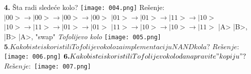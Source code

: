 \documentclass{article}
\begin{document}
\vspace{0.4cm}\newline
\textbf{4.} Šta radi sledeće kolo?
\newline
\texttt{[image: 004.png]}
\vspace*{0.4cm}\newline
Rešenje: \vspace{0.2cm}\newline
$|00> \longrightarrow |00> \longrightarrow |00> \longrightarrow |00>$
\newline
$|01> \longrightarrow |01> \longrightarrow |11> \longrightarrow |10>$
\newline
$|10> \longrightarrow |11> \longrightarrow |01> \longrightarrow |01>$
\newline
$|11> \longrightarrow |10> \longrightarrow |10> \longrightarrow |11>$
\newline \Rightarrow |A> \longrightarrow |B>, |B> \longrightarrow |A>, "swap"
\vspace{0.6cm}\newline
\textit{Tofolijevo kolo}
\vspace{0.3cm}\newline
\texttt{[image: 005.png]} 
\vspace{0.2cm}\newline
$\textbf{5.} Kako biste iskoristili Tofolijevo kolo za implementaciju NAND kola?$
\vspace*{0.4cm}\newline
$Rešenje:$ \vspace{0.2cm}\newline
\texttt{[image: 006.png]}
\vspace{4cm}\newline
$\textbf{6.} Kako biste iskoristili Tofolijevo kolo da napravite "kopiju"?$
\vspace*{0.4cm}\newline
$Rešenje:$ \vspace{0.2cm}\newline
\texttt{[image: 007.png]}
\newpage
\end{document}
